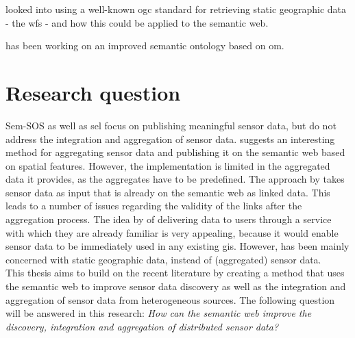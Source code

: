 \cite{SW:Jones} looked into using a well-known \ac{ogc} standard for retrieving static geographic data - the \ac{wfs} - and how this could be applied to the semantic web.

\cite{SSW:Cox3} has been working on an improved semantic ontology based on \ac{om}. 

\section{Research question}
Sem-SOS \citep{SSW:Henson, SSW:Pschorr} as well as \ac{sel} \citep{SSW:Janowicz} focus on publishing meaningful sensor data, but do not address the integration and aggregation of sensor data. \cite{SSW:Stasch} suggests an interesting method for aggregating sensor data and publishing it on the semantic web based on spatial features. However, the implementation is limited in the aggregated data it provides, as the aggregates have to be predefined. The approach by \cite{SSW:Stasch} takes sensor data as input that is already on the semantic web as linked data. This leads to a number of issues regarding the validity of the links after the aggregation process. The idea by \cite{SW:Jones} of delivering data to users through a service with which they are already familiar is very appealing, because it would enable sensor data to be immediately used in any existing \ac{gis}. However, \cite{SW:Jones} has been mainly concerned with static geographic data, instead of (aggregated) sensor data. \\

This thesis aims to build on the recent literature by creating a method that uses the semantic web to improve sensor data discovery as well as the integration and aggregation of sensor data from heterogeneous sources. The following question will be answered in this research:   
\textit{How can the semantic web improve the discovery, integration and aggregation of distributed sensor data?} 












































